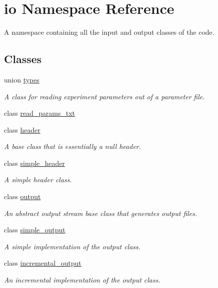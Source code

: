 \hypertarget{namespaceio}{\section{io Namespace Reference}
\label{namespaceio}
}


A namespace containing all the input and output classes of the code.  


\subsection*{Classes}
\begin{DoxyCompactItemize}
\item 
union \hyperlink{unionio_1_1types}{types}
\begin{DoxyCompactList}\small\item\em A class for reading experiment parameters out of a parameter file. \end{DoxyCompactList}\item 
class \hyperlink{classio_1_1read__params__txt}{read\-\_\-params\-\_\-txt}
\item 
class \hyperlink{classio_1_1header}{header}
\begin{DoxyCompactList}\small\item\em A base class that is essentially a null header. \end{DoxyCompactList}\item 
class \hyperlink{classio_1_1simple__header}{simple\-\_\-header}
\begin{DoxyCompactList}\small\item\em A simple header class. \end{DoxyCompactList}\item 
class \hyperlink{classio_1_1output}{output}
\begin{DoxyCompactList}\small\item\em An abstract output stream base class that generates output files. \end{DoxyCompactList}\item 
class \hyperlink{classio_1_1simple__output}{simple\-\_\-output}
\begin{DoxyCompactList}\small\item\em A simple implementation of the output class. \end{DoxyCompactList}\item 
class \hyperlink{classio_1_1incremental__output}{incremental\-\_\-output}
\begin{DoxyCompactList}\small\item\em An incremental implementation of the output class. \end{DoxyCompactList}\end{DoxyCompactItemize}
